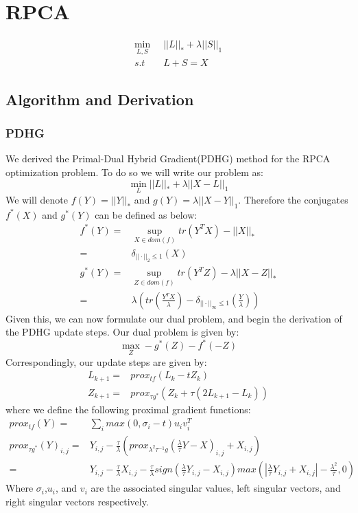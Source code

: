 \documentclass[12pt, letterpaper]{article}
\begin{document}
	\section{RPCA}
	\begin{align*}
				\min_{L,S}& \;\;||L||_{*}+\lambda||S||_{1}\\ s.t& \;\; L+S  =X
	\end{align*}
	
	\subsection{Algorithm and Derivation}
	\subsubsection{PDHG}
		We derived the Primal-Dual Hybrid Gradient(PDHG) method for the RPCA optimization problem. To do so we will write our problem as:
		\[\min_{L} ||L||_{*} +\lambda||X-L||_{1}\]
		We will denote $f(Y) = ||Y||_{*}$  and $g(Y) = \lambda||X-Y||_{1}$. Therefore the conjugates $f^{*}(X)$ and $g^{*}(Y)$ can be defined as below:
		\begin{align*}
			f^{*}(Y) =& \sup_{X\in dom(f)} tr(Y^{T}X)-||X||_{*}\\
					 =& \delta_{||\cdot||_{2} \leq 1}(X)\\
			g^{*}(Y) =& \sup_{Z\in dom(f)} tr(Y^{T}Z)-\lambda||X-Z||_{*}\\
			 =& \lambda \left(tr(\frac{Y^{T}X}{\lambda})- \delta_{||\cdot||_{\infty} \leq 1}(\frac{Y}{\lambda})\right)
		\end{align*}
		Given this, we can now formulate our dual problem, and begin the derivation of the PDHG update steps. Our dual problem is given by:
		\[\max_{Z} -g^{*}(Z) -f^{*}(-Z)\]
		Correspondingly, our update steps are given by:
		\begin{align*}
			L_{k+1} =& prox_{tf}(L_{k}- tZ_{k})\\
			Z_{k+1} =& prox_{\tau g^{*}}(Z_{k}+\tau(2L_{k+1}-L_{k}))
		\end{align*}
	where we define the following proximal gradient functions:
	\begin{align*}
		prox_{tf}(Y) =& \sum_{i}max(0,\sigma_{i}-t)u_{i}v_{i}^{T} \\
		prox_{\tau g^{*}}(Y)_{i,j} =& Y_{i,j} - \frac{\tau}{\lambda}\left( prox_{\lambda^{2}\tau^{-1}g}(\frac{\lambda}{\tau}Y-X)_{i,j} +X_{i,j}\right)\\
		=&
		 Y_{i,j}-\frac{\tau}{\lambda}X_{i,j}-\frac{\tau}{\lambda}sign(\frac{\lambda}{\tau}Y_{i,j}-X_{i,j})max(|\frac{\lambda}{\tau}Y_{i,j}+X_{i,j}|-\frac{\lambda^{2}}{\tau},0)
	\end{align*}
		Where $\sigma_{i}$,$u_{i}$, and $v_{i}$ are the associated singular values, left singular vectors, and right singular vectors respectively.
\end{document}
